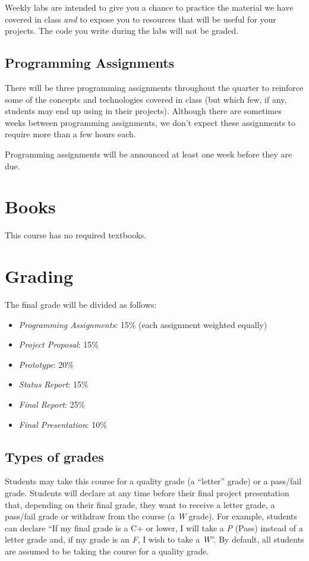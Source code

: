\documentclass[11pt]{article}
\begin{document}
Weekly labs are intended to give you a chance to practice the material
we have covered in class \emph{and} to expose you to resources that
will be useful for your projects. The code you write during the labs will not
be graded.

\subsection{Programming Assignments}

There will be three programming assignments throughout the quarter to reinforce
some of the concepts and technologies covered in class (but which few, if any,
students may end up using in their projects). Although there are
sometimes weeks between programming assignments, we don't expect these
assignments to require more than a few hours each.

Programming assignments will be announced at least one week before they are due.

\section{Books}

This course has no required textbooks.


\section{Grading}

The final grade will be divided as follows:

\begin{itemize}
 \item \emph{Programming Assignments}: 15\% (each assignment weighted equally)
 \item \emph{Project Proposal}: 15\%
 \item \emph{Prototype}: 20\%
 \item \emph{Status Report}: 15\%
 \item \emph{Final Report}: 25\%
 \item \emph{Final Presentation}: 10\%
\end{itemize}


\subsection{Types of grades}

Students may take this course for a quality grade (a ``letter'' grade)
or a pass/fail grade. Students will declare at any time before their final project presentation that,
depending on their final grade, they want to receive a letter grade, a
pass/fail grade or withdraw from the course (a \emph{W} grade). For
example, students can declare ``If my final grade is a C+ or lower, I
will take a \emph{P} (Pass) instead of a letter grade and, if my grade
is an \emph{F}, I wish to take a \emph{W}''. By default, all students
are assumed to be taking the course for a quality grade.
\end{document}
